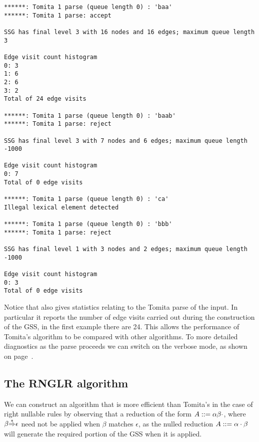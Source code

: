 {\small
\begin{verbatim}
******: Tomita 1 parse (queue length 0) : 'baa'
******: Tomita 1 parse: accept

SSG has final level 3 with 16 nodes and 16 edges; maximum queue length 3

Edge visit count histogram
0: 3
1: 6
2: 6
3: 2
Total of 24 edge visits

******: Tomita 1 parse (queue length 0) : 'baab'
******: Tomita 1 parse: reject

SSG has final level 3 with 7 nodes and 6 edges; maximum queue length -1000

Edge visit count histogram
0: 7
Total of 0 edge visits

******: Tomita 1 parse (queue length 0) : 'ca'
Illegal lexical element detected

******: Tomita 1 parse (queue length 0) : 'bbb'
******: Tomita 1 parse: reject

SSG has final level 1 with 3 nodes and 2 edges; maximum queue length -1000

Edge visit count histogram
0: 3
Total of 0 edge visits
\end{verbatim}
}

Notice that \gtb also gives statistics relating to the Tomita parse of
the input. In particular it reports the 
number of edge visits carried out during the construction of the GSS,
in the first example there are 24. This allows the performance of Tomita's
algorithm to be compared with other algorithms.
To more detailed diagnostics as the parse proceeds we can switch
on the verbose mode, as shown on page~\pageref{verb}.



\subsection{The RNGLR algorithm}

We can construct an algorithm that is
more efficient than Tomita's in the case of
right nullable rules by observing that a reduction of the form
$A::=\alpha\beta\cdot$, where $\beta{\mathop{\Rightarrow}\limits^*}\epsilon$ need not be
applied when $\beta$ matches $\epsilon$, as the nulled reduction 
$A::=\alpha\cdot\beta$ will generate the required portion of the 
GSS when it is applied.



